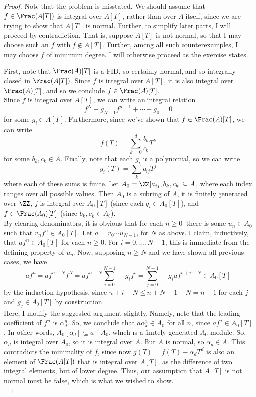 \begin{proof}
	Note that the problem is misstated. We should assume that $f \in \Frac(A[T])$ is integral over $A[T]$, rather than over $A$ itself, since we are trying to show that $A[T]$ is normal. Further, to simplify later parts, I will proceed by contradiction. That is, suppose $A[T]$ is not normal, so that I may choose such an $f$ with $f \notin A[T]$. Further, among all such counterexamples, I may choose $f$ of minimum degree. I will otherwise proceed as the exercise states.
	
	First, note that $\Frac(A)[T]$ is a PID, so certainly normal, and so integrally closed in $\Frac(A[T])$. Since $f$ is integral over $A[T]$, it is also integral over $\Frac(A)[T]$, and so we conclude $f \in \Frac(A)[T]$. \\
	
	Since $f$ is integral over $A[T]$, we can write an integral relation
	\[ f^N + g_{N-1}f^{n-1} + \cdots + g_0 = 0 \]
	for some $g_i \in A[T]$. Furthermore, since we've shown that $f \in \Frac(A)[T]$, we can write
	\[ f(T) = \sum_{k=0}^d \frac{b_k}{c_k}T^k \]
	for some $b_k,c_k \in A$. Finally, note that each $g_i$ is a polynomial, so we can write
	\[ g_i(T) = \sum_k a_{ij}T^j \]
	where each of these sums is finite. Let $A_0 = \ZZ[a_{ij},b_k,c_k] \subseteq A$, where each index ranges over all possible values. Then $A_0$ is a subring of $A$, it is finitely generated over $\ZZ$, $f$ is integral over $A_0[T]$ (since each $g_i \in A_0[T]$), and $f \in \Frac(A_0)[T]$ (since $b_k,c_k \in A_0$). \\
	
	By clearing denominators, it is obvious that for each $n \geq 0$, there is some $u_n \in A_0$ such that $u_nf^n \in A_0[T]$. Let $a = u_0 \cdots u_{N-1}$, for $N$ as above. I claim, inductively, that $af^n \in A_0[T]$ for each $n \geq 0$. For $i=0,\ldots,N-1$, this is immediate from the defining property of $u_n$. Now, supposing $n \geq N$ and we have shown all previous cases, we have
	\[ af^n = af^{n-N}f^N = af^{n-N}\sum_{i=0}^{N-1} -g_if^i = \sum_{j=0}^{N-1} -g_iaf^{n+i-N} \in A_0[T] \]
	by the induction hypothesis, since $n+i-N \leq n+N-1-N = n-1$ for each $j$ and $g_j \in A_0[T]$ by construction. \\
	
	Here, I modify the suggested argument slightly. Namely, note that the leading coefficient of $f^n$ is $\alpha_d^n$. So, we conclude that $a\alpha_d^n \in A_0$ for all $n$, since $af^n \in A_0[T]$. In other words, $A_0[\alpha_d] \subseteq a^{-1}A_0$, which is a finitely generated $A_0$-module. So, $\alpha_d$ is integral over $A_0$, so it is integral over $A$. But $A$ is normal, so $\alpha_d \in A$. This contradicts the minimality of $f$, since now $g(T) = f(T) - \alpha_dT^d$ is also an element of $\Frac(A[T])$ that is integral over $A[T]$, as the difference of two integral elements, but of lower degree. Thus, our assumption that $A[T]$ is not normal must be false, which is what we wished to show. \\
	

\end{proof}
